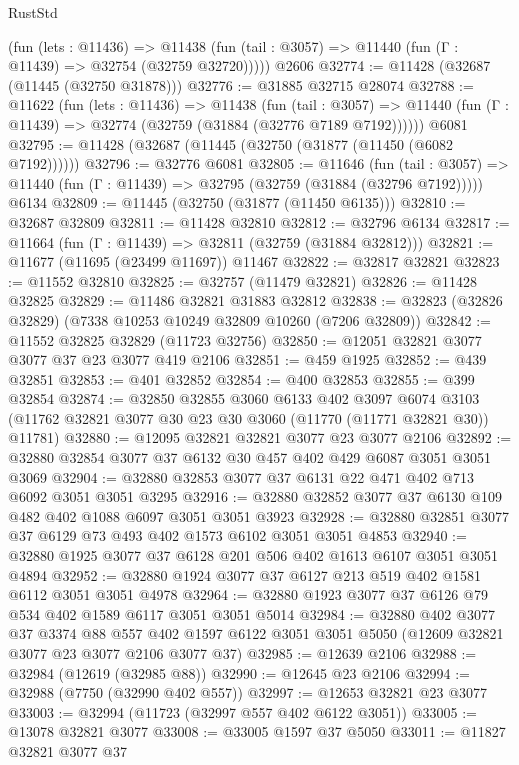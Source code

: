 \begin{lexlean}{RustStd}
\begin{coremodule}
      (fun (lets : @11436) =>
      @11438 (fun (tail : @3057) => @11440 (fun (Γ : @11439) => @32754 (@32759 @32720)))))
    @2606
@32774 := @11428 (@32687 (@11445 (@32750 @31878)))
@32776 := @31885 @32715 @28074
@32788 := @11622
    (fun (lets : @11436) =>
    @11438
      (fun (tail : @3057) =>
      @11440 (fun (Γ : @11439) => @32774 (@32759 (@31884 (@32776 @7189 @7192))))))
    @6081
@32795 := @11428 (@32687 (@11445 (@32750 (@31877 (@11450 (@6082 @7192))))))
@32796 := @32776 @6081
@32805 := @11646
    (fun (tail : @3057) => @11440 (fun (Γ : @11439) => @32795 (@32759 (@31884 (@32796 @7192)))))
    @6134
@32809 := @11445 (@32750 (@31877 (@11450 @6135)))
@32810 := @32687 @32809
@32811 := @11428 @32810
@32812 := @32796 @6134
@32817 := @11664 (fun (Γ : @11439) => @32811 (@32759 (@31884 @32812)))
@32821 := @11677 (@11695 (@23499 @11697)) @11467
@32822 := @32817 @32821
@32823 := @11552 @32810
@32825 := @32757 (@11479 @32821)
@32826 := @11428 @32825
@32829 := @11486 @32821 @31883 @32812
@32838 := @32823 (@32826 @32829) (@7338 @10253 @10249 @32809 @10260 (@7206 @32809))
@32842 := @11552 @32825 @32829 (@11723 @32756)
@32850 := @12051 @32821 @3077 @3077 @37 @23 @3077 @419 @2106
@32851 := @459 @1925
@32852 := @439 @32851
@32853 := @401 @32852
@32854 := @400 @32853
@32855 := @399 @32854
@32874 := @32850
    @32855
    @3060
    @6133
    @402
    @3097
    @6074
    @3103
    (@11762 @32821 @3077 @30 @23 @30 @3060 (@11770 (@11771 @32821 @30)) @11781)
@32880 := @12095 @32821 @32821 @3077 @23 @3077 @2106
@32892 := @32880 @32854 @3077 @37 @6132 @30 @457 @402 @429 @6087 @3051 @3051 @3069
@32904 := @32880 @32853 @3077 @37 @6131 @22 @471 @402 @713 @6092 @3051 @3051 @3295
@32916 := @32880 @32852 @3077 @37 @6130 @109 @482 @402 @1088 @6097 @3051 @3051 @3923
@32928 := @32880 @32851 @3077 @37 @6129 @73 @493 @402 @1573 @6102 @3051 @3051 @4853
@32940 := @32880 @1925 @3077 @37 @6128 @201 @506 @402 @1613 @6107 @3051 @3051 @4894
@32952 := @32880 @1924 @3077 @37 @6127 @213 @519 @402 @1581 @6112 @3051 @3051 @4978
@32964 := @32880 @1923 @3077 @37 @6126 @79 @534 @402 @1589 @6117 @3051 @3051 @5014
@32984 := @32880
    @402
    @3077
    @37
    @3374
    @88
    @557
    @402
    @1597
    @6122
    @3051
    @3051
    @5050
    (@12609 @32821 @3077 @23 @3077 @2106 @3077 @37)
@32985 := @12639 @2106
@32988 := @32984 (@12619 (@32985 @88))
@32990 := @12645 @23 @2106
@32994 := @32988 (@7750 (@32990 @402 @557))
@32997 := @12653 @32821 @23 @3077
@33003 := @32994 (@11723 (@32997 @557 @402 @6122 @3051))
@33005 := @13078 @32821 @3077
@33008 := @33005 @1597 @37 @5050
@33011 := @11827 @32821 @3077 @37

\end{coremodule}
\end{lexlean}
